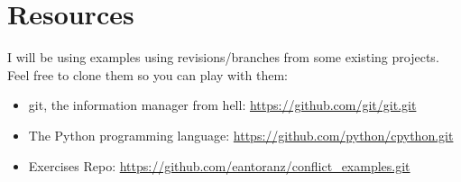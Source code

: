 
\section{Resources}

I will be using examples using revisions/branches from some existing projects. Feel free to clone them so you can play with them:

\begin{itemize}

	\item git, the information manager from hell: \url{https://github.com/git/git.git}
	\label{git_repo}

	\item The Python programming language: \url{https://github.com/python/cpython.git}
	\label{python_repo}
	
	\item Exercises Repo: \url{https://github.com/eantoranz/conflict_examples.git}
	\label{exercises_repo}

\end{itemize}
